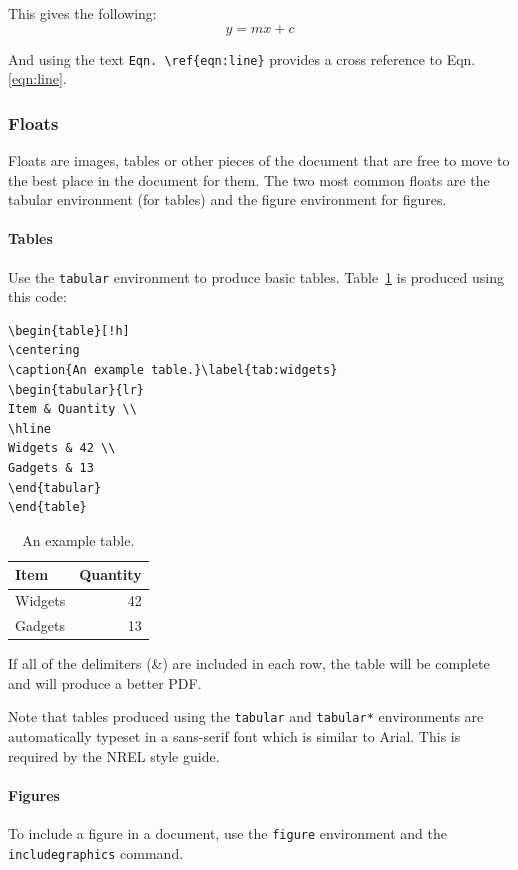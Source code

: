 This gives the following:
\begin{equation}
y = mx+c
\label{eqn:line}
\end{equation}

And using the text \verb+Eqn. \ref{eqn:line}+ provides a cross reference to Eqn. \ref{eqn:line}.

\subsubsection{Floats}
Floats are images, tables or other pieces of the document that are free to move to the best place in the document for them. The two most common floats are the tabular environment (for tables) and the figure environment for figures.

\paragraph{Tables}
Use the \texttt{tabular} environment to produce basic tables. Table~\ref{tab:widgets} is produced using this code: 

\begin{lstlisting}
\begin{table}[!h]
\centering
\caption{An example table.}\label{tab:widgets}
\begin{tabular}{lr}
Item & Quantity \\
\hline
Widgets & 42 \\
Gadgets & 13
\end{tabular}
\end{table}
\end{lstlisting}

\begin{table}[!h]
\centering
\caption{An example table.}\label{tab:widgets}
\begin{tabular}{lr}
Item & Quantity \\
\hline
Widgets & 42 \\
Gadgets & 13
\end{tabular}
\end{table}

If all of the delimiters (\&) are included in each row, the table will be complete and will produce a better PDF.

Note that tables produced using the \texttt{tabular} and \texttt{tabular*} environments are automatically typeset in a sans-serif font which is similar to Arial. This is required by the NREL style guide.

\paragraph{Figures}
To include a figure in a document, use the \texttt{figure} environment and the \texttt{includegraphics} command.

